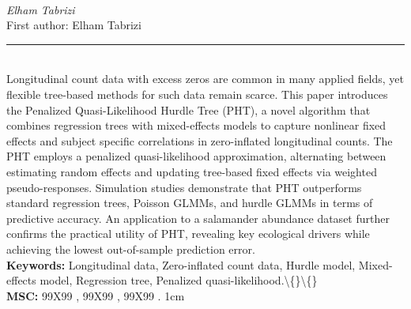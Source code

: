 \documentclass[10pt,twoside]{article}
\begin{document}
\noindent\begin{minipage}[t][\textheight]{\textwidth}
\\[0.35em]
{\itshape Elham Tabrizi}\\[0.2em]
{\footnotesize First author: Elham Tabrizi}\\[0.45em]
\noindent\rule{\textwidth}{0.3pt}\\[0.4em]
{\footnotesize  Longitudinal count data with excess zeros are common in many applied fields, yet flexible tree-based methods for such data remain scarce. This paper introduces the Penalized Quasi-Likelihood Hurdle Tree (PHT), a novel algorithm that combines regression trees with mixed-effects models to capture nonlinear fixed effects and subject specific correlations in zero-inflated longitudinal counts. The PHT employs a penalized quasi-likelihood approximation, alternating between estimating random effects and updating tree-based fixed effects via weighted pseudo-responses. Simulation studies demonstrate that PHT outperforms standard regression trees, Poisson GLMMs, and hurdle GLMMs in terms of predictive accuracy. An application to a salamander abundance dataset further confirms the practical utility of PHT, revealing key ecological drivers while achieving the lowest out-of-sample prediction error.}\\[0.4em]
{\footnotesize\bfseries Keywords:} {\footnotesize Longitudinal data, Zero-inflated count data, Hurdle model, Mixed-effects model, Regression tree, Penalized quasi-likelihood.\textbackslash\{\}\textbackslash\{\}}\\[0.15em]
{\footnotesize\bfseries MSC:} {\footnotesize 99X99 , 99X99 , 99X99 . 1cm}\\
\vfill
\end{minipage}
\newpage
\end{document}
